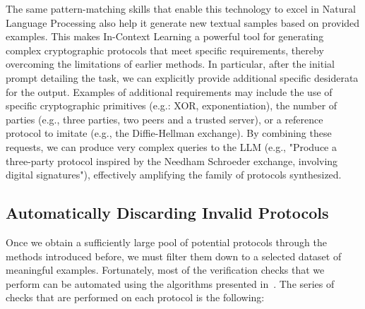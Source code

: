The same pattern-matching skills that enable this technology to excel in Natural Language Processing also help it generate new textual samples based on provided examples. This makes In-Context Learning a powerful tool for generating complex cryptographic protocols that meet specific requirements, thereby overcoming the limitations of earlier methods. In particular, after the initial prompt detailing the task, we can explicitly provide additional specific desiderata for the output. Examples of additional requirements may include the use of specific cryptographic primitives (e.g.: XOR, exponentiation), the number of parties (e.g., three parties, two peers and a trusted server), or a reference protocol to imitate (e.g., the Diffie-Hellman exchange). By combining these requests, we can produce very complex queries to the LLM (e.g., "Produce a three-party protocol inspired by the Needham Schroeder exchange, involving digital signatures"), effectively amplifying the family of protocols synthesized.

\subsection{Automatically Discarding Invalid Protocols}
Once we obtain a sufficiently large pool of potential protocols through the methods introduced before, we must filter them down to a selected dataset of meaningful examples. Fortunately, most of the verification checks that we perform can be automated using the algorithms presented in~\cite{basin2015alice}.
The series of checks that are performed on each protocol is the following: 

